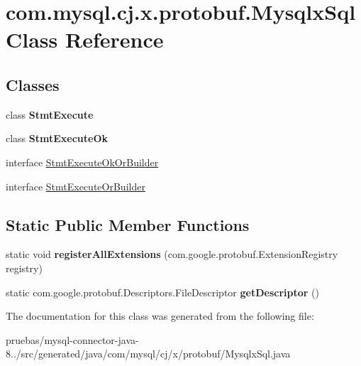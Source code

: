 \hypertarget{classcom_1_1mysql_1_1cj_1_1x_1_1protobuf_1_1_mysqlx_sql}{}\section{com.\+mysql.\+cj.\+x.\+protobuf.\+Mysqlx\+Sql Class Reference}
\label{classcom_1_1mysql_1_1cj_1_1x_1_1protobuf_1_1_mysqlx_sql}
\subsection*{Classes}
\begin{DoxyCompactItemize}
\item 
class {\bfseries Stmt\+Execute}
\item 
class {\bfseries Stmt\+Execute\+Ok}
\item 
interface \mbox{\hyperlink{interfacecom_1_1mysql_1_1cj_1_1x_1_1protobuf_1_1_mysqlx_sql_1_1_stmt_execute_ok_or_builder}{Stmt\+Execute\+Ok\+Or\+Builder}}
\item 
interface \mbox{\hyperlink{interfacecom_1_1mysql_1_1cj_1_1x_1_1protobuf_1_1_mysqlx_sql_1_1_stmt_execute_or_builder}{Stmt\+Execute\+Or\+Builder}}
\end{DoxyCompactItemize}
\subsection*{Static Public Member Functions}
\begin{DoxyCompactItemize}
\item 
\mbox{\label{classcom_1_1mysql_1_1cj_1_1x_1_1protobuf_1_1_mysqlx_sql_abf06fecb34bc8f5994a1b8f2098c97cf}} 
static void {\bfseries register\+All\+Extensions} (com.\+google.\+protobuf.\+Extension\+Registry registry)
\item 
\mbox{\label{classcom_1_1mysql_1_1cj_1_1x_1_1protobuf_1_1_mysqlx_sql_a767add83f70d0d54e80f197365cf75dc}} 
static com.\+google.\+protobuf.\+Descriptors.\+File\+Descriptor {\bfseries get\+Descriptor} ()
\end{DoxyCompactItemize}


The documentation for this class was generated from the following file\+:\begin{DoxyCompactItemize}
\item 
pruebas/mysql-\/connector-\/java-\/8../src/generated/java/com/mysql/cj/x/protobuf/Mysqlx\+Sql.\+java\end{DoxyCompactItemize}
